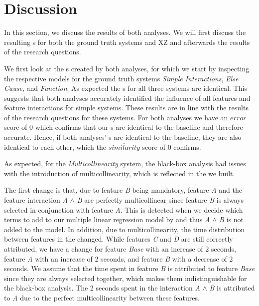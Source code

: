 
\section{Discussion}\label{sec:discussion}

In this section, we discuss the results of both analyses. We will first discuss the resulting {\perfInfluenceModel}s 
for both the ground truth systems and \textsc{XZ} and afterwards the results of the research questions.

We first look at the {\perfInfluenceModel}s created by both analyses,
for which we start by inspecting the respective models for the ground truth systems \emph{Simple Interactions},
\emph{Else Cause}, and \emph{Function}. As expected the {\perfInfluenceModel}s for all three systems are identical.
This suggests that both analyses accurately identified the influence of all features and feature interactions for simple systems.
These results are in line with the results of the research questions for these systems.
For both analyses we have an $\overline{error}$ score of $0$ which confirms that our {\perfInfluenceModel}s are identical to the baseline and
therefore  accurate. Hence, if both analyses' {\perfInfluenceModel}s are identical to the baseline, they are also identical to each other,
which the $\overline{similarity}$ score of $0$ confirms.

As expected, for the \emph{Multicollinearity} system, the black-box analysis had issues with the introduction of multicollinearity, 
which is reflected in the {\perfInfluenceModel} we built.

The first change is that, due to feature \emph{B} being mandatory,
feature \emph{A} and the feature interaction \emph{A} $\land$ \emph{B} are perfectly multicollinear since feature \emph{B}
is always selected in conjunction with feature \emph{A}.
This is detected when we decide which terms to add to our multiple linear regression model by 
and thus \emph{A} $\land$ \emph{B} is not added to the model. In addition, due to multicollinearity, the time distribution between features in the
{\perfInfluenceModel} changed. While features \emph{C} and \emph{D} are still correctly attributed,
we have a change for feature \emph{Base} with an increase of 2 seconds, feature \emph{A} with an increase of 2 seconds,
and feature \emph{B} with a decrease of 2 seconds.
We assume that the time spent in feature \emph{B} is attributed to feature \emph{Base}
since they are always selected together, which makes them indistinguishable for the black-box analysis.
The 2 seconds spent in the interaction \emph{A} $\land$ \emph{B} is attributed to \emph{A} due to the perfect multicollinearity 
between these features. 

